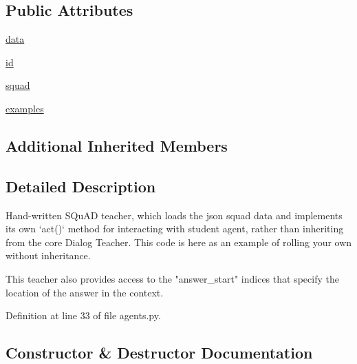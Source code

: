 \subsection*{Public Attributes}
\begin{DoxyCompactItemize}
\item 
\hyperlink{classparlai_1_1tasks_1_1squad_1_1agents_1_1IndexTeacher_a5642534b352e57c59dec249f9305d80d}{data}
\item 
\hyperlink{classparlai_1_1tasks_1_1squad_1_1agents_1_1IndexTeacher_a7c35d02788f1d513a7b815083cfecbf8}{id}
\item 
\hyperlink{classparlai_1_1tasks_1_1squad_1_1agents_1_1IndexTeacher_a419cb93430d8865d83f4968daf3b77d1}{squad}
\item 
\hyperlink{classparlai_1_1tasks_1_1squad_1_1agents_1_1IndexTeacher_a2ab5fd73dc8ce2b290aebd13f40540b5}{examples}
\end{DoxyCompactItemize}
\subsection*{Additional Inherited Members}


\subsection{Detailed Description}
\begin{DoxyVerb}Hand-written SQuAD teacher, which loads the json squad data and
implements its own `act()` method for interacting with student agent,
rather than inheriting from the core Dialog Teacher. This code is here as
an example of rolling your own without inheritance.

This teacher also provides access to the "answer_start" indices that
specify the location of the answer in the context.
\end{DoxyVerb}
 

Definition at line 33 of file agents.\+py.



\subsection{Constructor \& Destructor Documentation}
\mbox{\label{classparlai_1_1tasks_1_1squad_1_1agents_1_1IndexTeacher_ad198efa0868254d0ec2f45582e601849}} 
